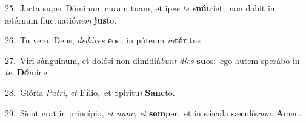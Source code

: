 {\numbfont\textcolor{\numbcolor}{25.}}~Jacta super Dóminum curam tuam, et ip\textit{se} \textit{te} \textit{e}\-\textbf{nú}triet:~\star non dabit in ætérnum fluctuatió\textit{nem} \textbf{jus}\-to.\par
{\numbfont\textcolor{\numbcolor}{26.}}~Tu vero, Deus, \textit{de}\-\textit{dú}\textit{ces} \textbf{e}\-os,~\star in púteum \textit{in}\-\textbf{tér}itus\par
{\numbfont\textcolor{\numbcolor}{27.}}~Viri sánguinum, et dolósi non dimidiá\textit{bunt} \textit{di}\-\textit{es} \textbf{su}\-os:~\star ego autem sperábo in \textit{te}\-, \textbf{Dó}\-mine.\par
{\numbfont\textcolor{\numbcolor}{28.}}~Glória \textit{Pa}\-\textit{tri}, \textit{et} \textbf{Fí}\-lio,~\star et Spirítu\textit{i} \textbf{Sanc}\-to.\par
{\numbfont\textcolor{\numbcolor}{29.}}~Sicut erat in princípio, \textit{et} \textit{nunc}\-, \textit{et} \textbf{sem}\-per,~\star et in sǽcula sæculó\-\textit{rum}\-. \textbf{A}\-men.\par
